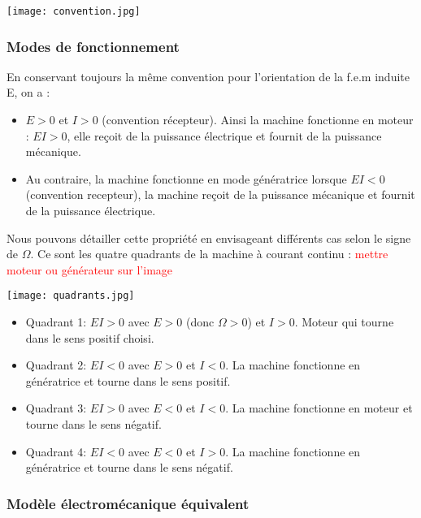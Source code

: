 \documentclass[12pt,prb,aps,epsf]{article}
\begin{document}
\begin{center}
    \texttt{[image: convention.jpg]}
\end{center}


\subsubsection{Modes de fonctionnement}

En conservant toujours la même convention pour l'orientation de la f.e.m induite E, on a  :

\begin{itemize}
    \item $E > 0$ et $I>0$ (convention récepteur). Ainsi la machine fonctionne en moteur : $EI>0$, elle reçoit de la puissance électrique et fournit de la puissance mécanique.
    \item Au contraire, la machine fonctionne en mode génératrice lorsque $EI<0$ (convention recepteur), la machine reçoit de la puissance mécanique et fournit de la puissance électrique.
\end{itemize}

Nous pouvons détailler cette propriété en envisageant différents cas selon le signe de $\Omega$. Ce sont les quatre quadrants de la machine à courant continu : \textcolor{red}{mettre moteur ou générateur sur l'image}


\begin{center}
    \texttt{[image: quadrants.jpg]}
\end{center}


\begin{itemize}
    \item Quadrant 1: $EI>0$ avec $E>0$ (donc $\Omega >0$) et $I>0$. Moteur qui tourne dans le sens positif choisi.
    \item Quadrant 2: $EI<0$ avec $E>0$ et $I<0$. La machine fonctionne en génératrice et tourne dans le sens positif.
    \item Quadrant 3: $EI>0$ avec $E<0$ et $I<0$. La machine fonctionne en moteur et tourne dans le sens négatif.
    \item Quadrant 4: $EI<0$ avec $E<0$ et $I>0$. La machine fonctionne en génératrice et tourne dans le sens négatif.
\end{itemize}

\subsubsection{Modèle électromécanique équivalent}
\end{document}

